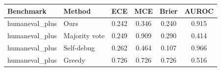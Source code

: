\begin{tabular}{llcccc}
\toprule
Benchmark & Method & ECE & MCE & Brier & AUROC \\
\midrule
humaneval_plus & Ours & 0.242 & 0.346 & 0.240 & 0.915 \\
humaneval_plus & Majority vote & 0.249 & 0.909 & 0.290 & 0.414 \\
humaneval_plus & Self-debug & 0.262 & 0.464 & 0.107 & 0.966 \\
humaneval_plus & Greedy & 0.726 & 0.726 & 0.726 & 0.516 \\
\bottomrule
\end{tabular}
